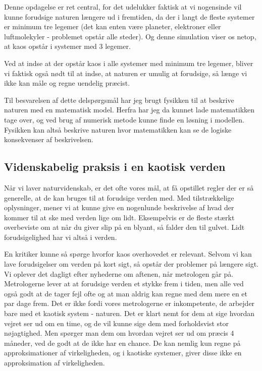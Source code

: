 \documentclass[12pt,a4paper]{article}
\theoremstyle{break}
\theoremstyle{nonumberplain}
\begin{document}
Denne opdagelse er ret central, for det udelukker faktisk at vi nogensinde vil kunne forudsige naturen længere ud i fremtiden, da der i langt de fleste systemer er minimum tre legemer (det kan enten være planeter, elektroner eller luftmolekyler - problemet opstår alle steder). 
Og denne simulation viser os netop, at kaos opstår i systemer med 3 legemer.

Ved at indse at der opstår kaos i alle systemer med minimum tre legemer, bliver vi faktisk også nødt til at indse, at naturen er umulig at forudsige, så længe vi ikke kan måle og regne uendelig præcist.

Til besvarelsen af dette delspørgsmål har jeg brugt fysikken til at beskrive naturen med en matematisk model. 
Herfra har jeg da kunnet lade matematikken tage over, og ved brug af numerisk metode kunne finde en løsning i modellen. 
Fysikken kan altså beskrive naturen hvor matematikken kan se de logiske konsekvenser af beskrivelsen.

\subsection{Videnskabelig praksis i en kaotisk verden}
Når vi laver naturvidenskab, er det ofte vores mål, at få opstillet regler der er så generelle, at de kan bruges til at forudsige verden med. 
Med tilstrækkelige oplysninger, mener vi at kunne give en nogenlunde beskrivelse af hvad der kommer til at ske med verden lige om lidt.
Eksempelvis er de fleste stærkt overbeviste om at når du giver slip på en blyant, så falder den til gulvet. 
Lidt forudsigelighed har vi altså i verden. 

En kritiker kunne så spørge hvorfor kaos overhovedet er relevant. 
Selvom vi kan lave forudsigelser om verden på kort sigt, så opstår der problemer på længere sigt. 
Vi oplever det dagligt efter nyhederne om aftenen, når metrologen går på. 
Metrologerne lever at at forudsige verden et stykke frem i tiden, men alle ved også godt at de tager fejl ofte og at man aldrig kan regne med dem mere en et par dage frem. 
Det er ikke fordi vores metrologerne er inkompetente, de arbejder bare med et kaotisk system - naturen.
Det er klart nemt for dem at sige hvordan vejret ser ud om en time, og de vil kunne sige dem med forholdsvist stor nøjagtighed.
Men spørger man dem om hvordan vejret ser ud om præcis 4 måneder, ved de godt at de ikke har en chance. 
De kan nemlig kun regne på approksimationer af virkeligheden, og i kaotiske systemer, giver disse ikke en approksimation af virkeligheden.
\end{document}
